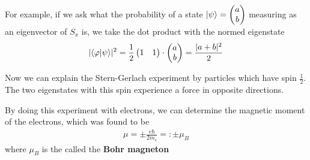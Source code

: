 For example, if we ask what the probability of a state $\ket{\psi} = \begin{pmatrix}
a \\ b
\end{pmatrix}$ measuring as an eigenvector of $S_x$ is, we take the dot product with the normed eigenstate
\begin{align*}
  \abs{\braket{\phi|\psi}}^{2} = \frac{1}{2} \begin{pmatrix}
  1 & 1
  \end{pmatrix}
  \cdot \begin{pmatrix}
  a \\ b
  \end{pmatrix}
  = \frac{\abs{a + b}^{2}}{2}
\end{align*}

Now we can explain the Stern-Gerlach experiment by particles which have spin $\tfrac{1}{2}$. The two eigenstates with this spin experience a force in opposite directions.

By doing this experiment with electrons, we can determine the magnetic moment of the electrons, which was found to be
\begin{align*}
  \mu = \pm \frac{e \hbar}{2 m_e} =: \pm \mu_B
\end{align*}
where $\mu_B$ is the called the \textbf{Bohr magneton}
